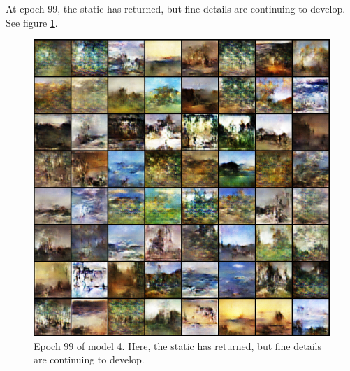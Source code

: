 \documentclass[11pt,letterpaper]{article}
\begin{document}
				At epoch 99, the static has returned, but fine details are continuing to develop.
				See figure \ref{fig:wa64:epoch099generator}.
				\begin{figure}
					\centering
					\includegraphics[width=1.0\linewidth]{results/model4/epoch099_generator}
					\caption{Epoch 99 of model 4. Here, the static has returned, but fine details are continuing to develop.}
					\label{fig:wa64:epoch099generator}
				\end{figure}
\end{document}
